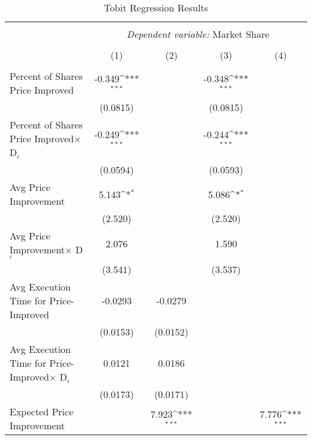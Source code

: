 \documentclass[12pt,a4paper]{extarticle}
\def\sym#1{\ifmmode^{#1}\else\(^{#1}\)\fi}
\begin{document}
\begin{table}[t] 
	\caption{Tobit Regression Results} 
	\label{table:3} 
	\footnotesize
	\begin{tabular}{@{\extracolsep{1.05em}}lcccc} 
		\\[-4ex]\hline  
		\hline \\[-1.8ex]  
		& \multicolumn{4}{c}{\textit{Dependent variable: }Market Share} \\  
		\cline{2-5}  
		\\[-1.8ex] & (1) & (2) & (3) & (4)\\  
		\hline \\[-1.8ex]  
		Percent of Shares Price Improved   &      -0.349\sym{***}&                     &      -0.348\sym{***}&                     \\
		&    (0.0815)         &                     &    (0.0815)         &                     \\
		[0.5em]
		Percent of Shares Price Improved$\times$ D$_i$&      -0.249\sym{***}&                     &      -0.244\sym{***}&                     \\
		&    (0.0594)         &                     &    (0.0593)         &                     \\
		[0.5em]
		Avg Price Improvement&       5.143\sym{*}  &                     &       5.086\sym{*}  &                     \\
		&     (2.520)         &                     &     (2.520)         &                     \\
		[0.5em]
		Avg Price Improvement$\times$ D$_i$&       2.076         &                     &       1.590         &                     \\
		&     (3.541)         &                     &     (3.537)         &                     \\
		[0.5em]
		Avg Execution Time for Price-Improved  &     -0.0293         &     -0.0279         &                     &                     \\
		&    (0.0153)         &    (0.0152)         &                     &                     \\
		[0.5em]
		Avg Execution Time for Price-Improved$\times$ D$_i$&      0.0121         &      0.0186         &                     &                     \\
		&    (0.0173)         &    (0.0171)         &                     &                     \\
		[0.5em]
		Expected Price Improvement&                     &       7.923\sym{***}&                     &       7.776\sym{***}\\

\end{tabular}
\end{table}
\end{document}
